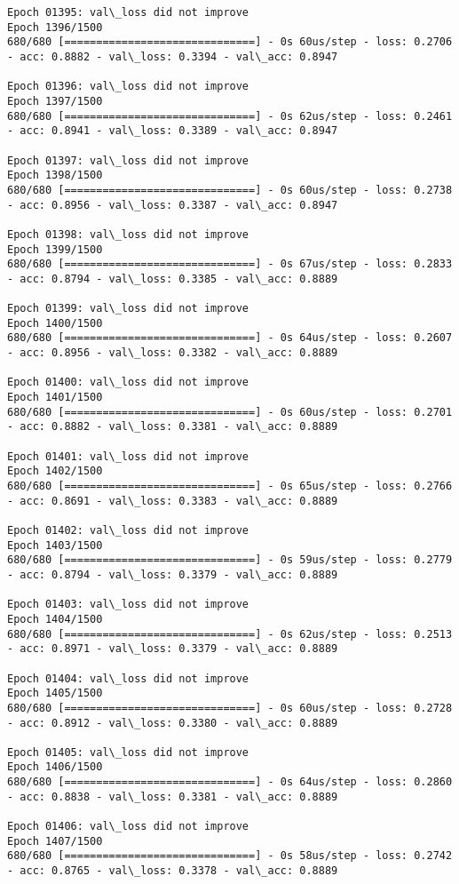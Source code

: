 \documentclass[11pt]{article}
\begin{document}
\begin{Verbatim}[commandchars=\\\{\}]
Epoch 01395: val\_loss did not improve
Epoch 1396/1500
680/680 [==============================] - 0s 60us/step - loss: 0.2706 - acc: 0.8882 - val\_loss: 0.3394 - val\_acc: 0.8947

Epoch 01396: val\_loss did not improve
Epoch 1397/1500
680/680 [==============================] - 0s 62us/step - loss: 0.2461 - acc: 0.8941 - val\_loss: 0.3389 - val\_acc: 0.8947

Epoch 01397: val\_loss did not improve
Epoch 1398/1500
680/680 [==============================] - 0s 60us/step - loss: 0.2738 - acc: 0.8956 - val\_loss: 0.3387 - val\_acc: 0.8947

Epoch 01398: val\_loss did not improve
Epoch 1399/1500
680/680 [==============================] - 0s 67us/step - loss: 0.2833 - acc: 0.8794 - val\_loss: 0.3385 - val\_acc: 0.8889

Epoch 01399: val\_loss did not improve
Epoch 1400/1500
680/680 [==============================] - 0s 64us/step - loss: 0.2607 - acc: 0.8956 - val\_loss: 0.3382 - val\_acc: 0.8889

Epoch 01400: val\_loss did not improve
Epoch 1401/1500
680/680 [==============================] - 0s 60us/step - loss: 0.2701 - acc: 0.8882 - val\_loss: 0.3381 - val\_acc: 0.8889

Epoch 01401: val\_loss did not improve
Epoch 1402/1500
680/680 [==============================] - 0s 65us/step - loss: 0.2766 - acc: 0.8691 - val\_loss: 0.3383 - val\_acc: 0.8889

Epoch 01402: val\_loss did not improve
Epoch 1403/1500
680/680 [==============================] - 0s 59us/step - loss: 0.2779 - acc: 0.8794 - val\_loss: 0.3379 - val\_acc: 0.8889

Epoch 01403: val\_loss did not improve
Epoch 1404/1500
680/680 [==============================] - 0s 62us/step - loss: 0.2513 - acc: 0.8971 - val\_loss: 0.3379 - val\_acc: 0.8889

Epoch 01404: val\_loss did not improve
Epoch 1405/1500
680/680 [==============================] - 0s 60us/step - loss: 0.2728 - acc: 0.8912 - val\_loss: 0.3380 - val\_acc: 0.8889

Epoch 01405: val\_loss did not improve
Epoch 1406/1500
680/680 [==============================] - 0s 64us/step - loss: 0.2860 - acc: 0.8838 - val\_loss: 0.3381 - val\_acc: 0.8889

Epoch 01406: val\_loss did not improve
Epoch 1407/1500
680/680 [==============================] - 0s 58us/step - loss: 0.2742 - acc: 0.8765 - val\_loss: 0.3378 - val\_acc: 0.8889


\end{Verbatim}
\end{document}
